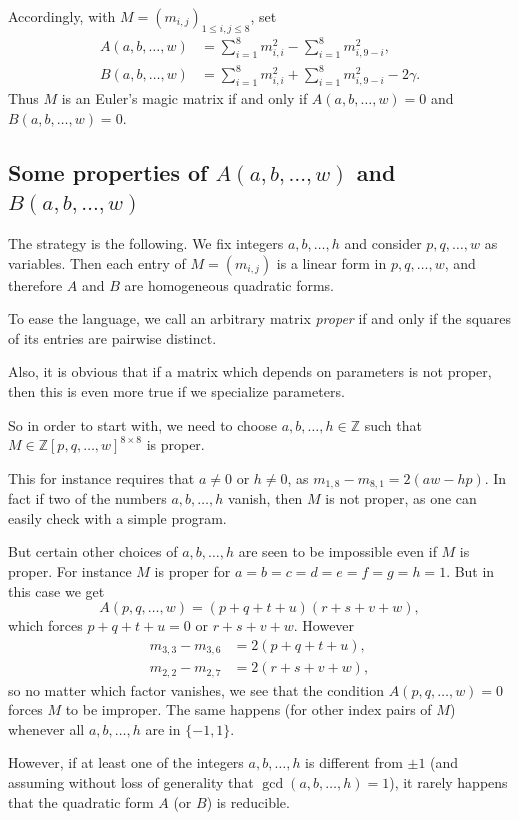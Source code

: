 \documentclass[12pt]{amsart}
\theoremstyle{definition}
\newcommand{\ZZ}{\mathbb Z}
\newcommand*{\set}[1]{\{#1\}}
\begin{document}
Accordingly, with $M=(m_{i,j})_{1\le i,j\le 8}$, set
\begin{align*}
  A(a,b,\dots,w) &= \sum_{i=1}^8m_{i,i}^2-\sum_{i=1}^8m_{i,9-i}^2,\\
  B(a,b,\dots,w) &= \sum_{i=1}^8m_{i,i}^2+\sum_{i=1}^8m_{i,9-i}^2-2\gamma.
\end{align*}
Thus $M$ is an Euler's magic matrix if and only if $A(a,b,\dots,w)=0$
and $B(a,b,\dots,w)=0$.
\subsection{\texorpdfstring{Some properties of $A(a,b,\dots,w)$ and
    $B(a,b,\dots,w)$}{A and B}}

The strategy is the following. We fix integers $a,b,\dots,h$ and
consider $p,q,\dots,w$ as variables. Then each entry of $M=(m_{i,j})$
is a linear form in $p,q,\dots,w$, and therefore $A$ and $B$ are
homogeneous quadratic forms.

To ease the language, we call an arbitrary matrix \emph{proper} if and
only if the squares of its entries are pairwise distinct.

Also, it is obvious that if a matrix which depends on parameters is
not proper, then this is even more true if we specialize parameters.

So in order to start with, we need to choose $a,b,\dots,h\in\ZZ$ such
that $M\in\ZZ[p,q,\dots,w]^{8\times 8}$ is proper.

This for instance requires that $a\ne0$ or $h\ne0$, as
$m_{1,8}-m_{8,1}=2(aw-hp)$. In fact if two of the numbers
$a,b,\dots,h$ vanish, then $M$ is not proper, as one can easily check
with a simple program.

But certain other choices of $a,b,\dots,h$ are seen to be impossible
even if $M$ is proper. For instance $M$ is proper for
$a=b=c=d=e=f=g=h=1$. But in this case we get
\[
  A(p,q,\dots,w) = (p + q + t + u)(r + s + v + w),
\]
which forces $p + q + t + u=0$ or $r + s + v + w$. However
\begin{align*}
  m_{3,3}-m_{3,6} &= 2(p + q + t + u),\\
  m_{2,2}-m_{2,7} &= 2(r + s + v + w),
\end{align*}
so no matter which factor vanishes, we see that the condition
$A(p,q,\dots,w)=0$ forces $M$ to be improper. The same happens (for
other index pairs of $M$) whenever all $a,b,\dots,h$ are in
$\set{-1,1}$.

However, if at least one of the integers $a,b,\dots,h$ is different
from $\pm1$ (and assuming without loss of generality that
$\gcd(a,b,\dots,h)=1$), it rarely happens that the quadratic form $A$
(or $B$) is reducible.
\end{document}
